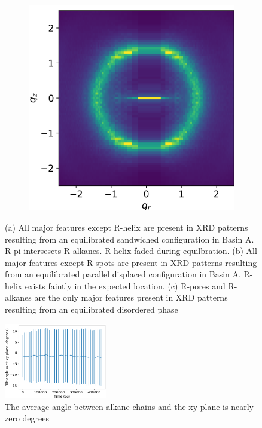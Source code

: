 \documentclass{article}
\begin{document}
\begin{figure}[!ht]
\begin{subfigure}{0.31\textwidth}
		\caption{}\label{fig:offsetrzplot}
	\end{subfigure}
	\begin{subfigure}{0.31\textwidth}
		\centering
		\hspace{-0.9cm}
		\includegraphics[width=\textwidth]{disorder_rzplot.png}
		\caption{}\label{fig:disorder_rzplot.png}
	\end{subfigure}
	\caption{(a) All major features except R-helix are present in
	XRD patterns resulting from an equilibrated sandwiched configuration 
	in Basin A. R-pi intersescts R-alkanes. R-helix faded during equilbration.
	(b) All major features execpt R-spots are present in XRD patterns 
	resulting from an equilibrated parallel displaced configuration in Basin A.
	R-helix exists faintly in the expected location. (c) R-pores and R-alkanes
	are the only major features present in XRD patterns resulting from an 
	equilibrated disordered phase}\label{fig:XRDsim}
  \end{figure}

  \begin{figure}
        \centering
        \includegraphics[width=0.4\textwidth]{tilt.png}
        \caption{The average angle between alkane chains and the xy plane is nearly zero degrees}\label{fig:tilt}
  \end{figure}
  
\end{document}
